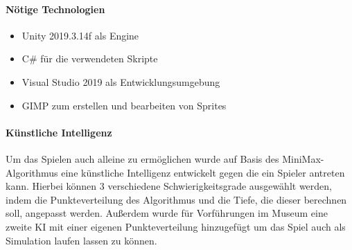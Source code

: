 \paragraph{Nötige Technologien}
\begin{itemize}
	\item Unity 2019.3.14f als Engine
	\item C\# für die verwendeten Skripte
	\item Visual Studio 2019 als Entwicklungsumgebung 
	\item GIMP zum erstellen und bearbeiten von Sprites
\end{itemize}

\paragraph{Künstliche Intelligenz}
Um das Spielen auch alleine zu ermöglichen wurde auf Basis des MiniMax-Algorithmus eine künstliche Intelligenz entwickelt gegen die ein Spieler antreten kann. Hierbei können 3 verschiedene Schwierigkeitsgrade ausgewählt werden, indem die Punkteverteilung des Algorithmus und die Tiefe, die dieser berechnen soll, angepasst werden. Außerdem wurde für Vorführungen im Museum eine zweite KI mit einer eigenen Punkteverteilung hinzugefügt um das Spiel auch als Simulation laufen lassen zu können.




